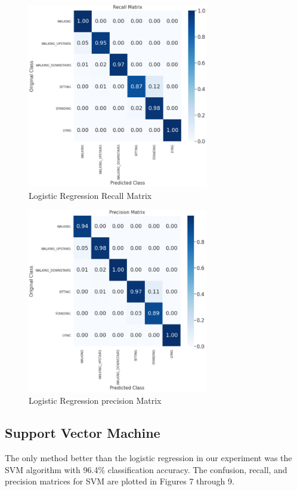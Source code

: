 \documentclass[12pt,conference]{IEEEtran}
\begin{document}
\begin{figure} [!t]
	\centering
	\includegraphics[width=3.1in]{Logistic_recall.PNG}
	\caption{Logistic Regression Recall Matrix}
	\label{}
\end{figure}

\begin{figure} [!t]
	\centering
	\includegraphics[width=3.1in]{Logistiv_pm.PNG}
	\caption{Logistic Regression precision Matrix}
	\label{}
\end{figure}

\subsection{Support Vector Machine}
The only method better than the logistic regression in our experiment was the SVM algorithm with 96.4\% classification accuracy. The confusion, recall, and precision matrices for SVM are plotted in Figures 7 through 9. 
\end{document}
